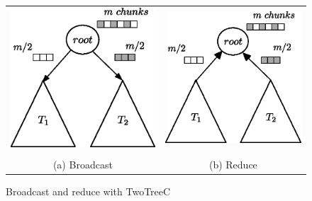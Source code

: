 \documentclass[sigplan,review,anonymous]{acmart}\settopmatter{printfolios=true,printccs=false,printacmref=false}
\begin{document}
\begin{figure}[h]
 
\begin{tabular}{cc}
\includegraphics[scale=0.46]{images/ttbroad.eps} &  \includegraphics[scale=0.46]{images/ttreduce.eps} \\ \\
(a) Broadcast & (b) Reduce \\
\end{tabular}
\caption{Broadcast and reduce with TwoTreeC}
\label{fig:towtreeC_coll}
\end{figure}
\end{document}
